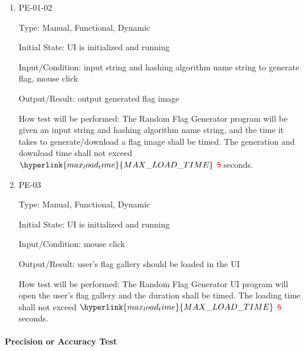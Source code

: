 \documentclass[12pt, titlepage]{article}
\begin{document}
\begin{enumerate}

\item{PE-01-02\\}

Type: Manual, Functional, Dynamic

Initial State: UI is initialized and running

Input/Condition: input string and hashing algorithm name string to generate
flag, mouse click

Output/Result: output generated flag image

How test will be performed: The Random Flag Generator program will be given an
input string and hashing algorithm name string, and the time it takes to
generate/download a flag image shall be timed. The generation and download
time shall not exceed \textcolor{red}{
$\hyperlink{max_load_time}{MAX\_LOAD\_TIME}$ \sout{5}} seconds.

\item{PE-03\\}

Type: Manual, Functional, Dynamic

Initial State: UI is initialized and running

Input/Condition: mouse click

Output/Result: user's flag gallery should be loaded in the UI

How test will be performed: The Random Flag Generator UI program will open the
user's flag gallery and the duration shall be timed. The loading time shall
not exceed \textcolor{red}{$\hyperlink{max_load_time}{MAX\_LOAD\_TIME}$
\sout{5}} seconds.

\end{enumerate}

\paragraph{Precision or Accuracy Test}
\end{document}
